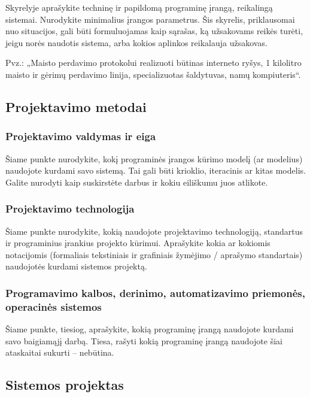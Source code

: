 \documentclass{ktuthesis}
\begin{document}
  Skyrelyje aprašykite techninę ir papildomą programinę įrangą, reikalingą sistemai. Nurodykite minimalius įrangos parametrus. Šis skyrelis, priklausomai nuo
  situacijos, gali būti formuluojamas kaip sąrašas, ką užsakovams reikės turėti, jeigu norės naudotis sistema, arba kokios aplinkos reikalauja užsakovas.

  Pvz.: „Maisto perdavimo protokolui realizuoti būtinas interneto ryšys, 1 kilolitro maisto ir gėrimų perdavimo linija, specializuotas šaldytuvas, namų kompiuteris“.

  \subsection{Projektavimo metodai}

  \subsubsection{Projektavimo valdymas ir eiga}

  Šiame punkte nurodykite, kokį programinės įrangos kūrimo modelį (ar modelius) naudojote kurdami savo sistemą. Tai gali būti krioklio, iteracinis ar kitas modelis.
  Galite nurodyti kaip suskirstėte darbus ir kokiu eiliškumu juos atlikote.

  \subsubsection{Projektavimo technologija}

  Šiame punkte nurodykite, kokią naudojote projektavimo technologiją, standartus ir programinius įrankius projekto kūrimui. Aprašykite kokia ar kokiomis notacijomis
  (formaliais tekstiniais ir grafiniais žymėjimo / aprašymo standartais) naudojotės kurdami sistemos projektą.

  \subsubsection{Programavimo kalbos, derinimo, automatizavimo priemonės, operacinės sistemos}

  Šiame punkte, tiesiog, aprašykite, kokią programinę įrangą naudojote kurdami savo baigiamąjį darbą. Tiesa, rašyti kokią programinę įrangą naudojote šiai ataskaitai
  sukurti – nebūtina.

  \subsection{Sistemos projektas}
\end{document}
